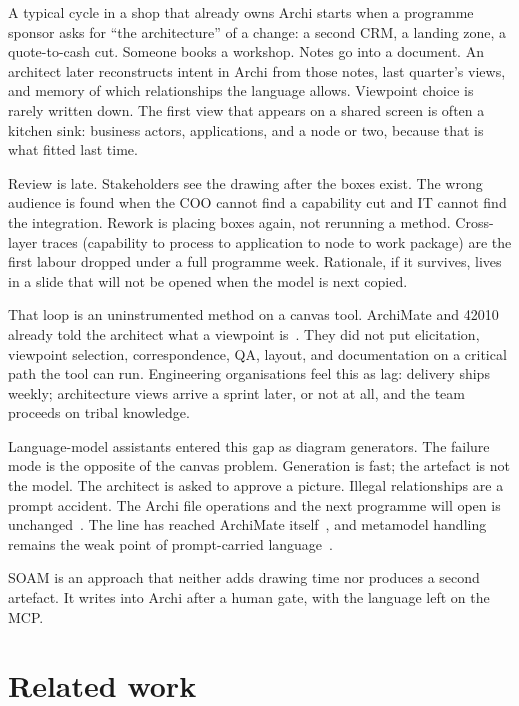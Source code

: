 \documentclass[10pt,journal,compsoc]{IEEEtran}
\begin{document}
A typical cycle in a shop that already owns Archi starts when a programme sponsor asks for ``the architecture'' of a change: a second CRM, a landing zone, a quote-to-cash cut. Someone books a workshop. Notes go into a document. An architect later reconstructs intent in Archi from those notes, last quarter's views, and memory of which relationships the language allows. Viewpoint choice is rarely written down. The first view that appears on a shared screen is often a kitchen sink: business actors, applications, and a node or two, because that is what fitted last time.

Review is late. Stakeholders see the drawing after the boxes exist. The wrong audience is found when the COO cannot find a capability cut and IT cannot find the integration. Rework is placing boxes again, not rerunning a method. Cross-layer traces (capability to process to application to node to work package) are the first labour dropped under a full programme week. Rationale, if it survives, lives in a slide that will not be opened when the model is next copied.

That loop is an uninstrumented method on a canvas tool. ArchiMate and 42010 already told the architect what a viewpoint is~\cite{iso42010,archimate32}. They did not put elicitation, viewpoint selection, correspondence, QA, layout, and documentation on a critical path the tool can run. Engineering organisations feel this as lag: delivery ships weekly; architecture views arrive a sprint later, or not at all, and the team proceeds on tribal knowledge.

Language-model assistants entered this gap as diagram generators. The failure mode is the opposite of the canvas problem. Generation is fast; the artefact is not the model. The architect is asked to approve a picture. Illegal relationships are a prompt accident. The Archi file operations and the next programme will open is unchanged~\cite{camara2023,fill2023}. The line has reached ArchiMate itself~\cite{nast2026}, and metamodel handling remains the weak point of prompt-carried language~\cite{muff2024}.

SOAM is an approach that neither adds drawing time nor produces a second artefact. It writes into Archi after a human gate, with the language left on the MCP.

\section{Related work}
\label{sec:related}
\end{document}
